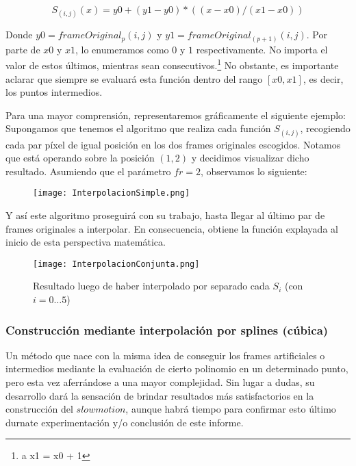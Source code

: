 \[
S_{(i,j)}(x) = y0 + (y1 - y0) * ( ( x - x0 ) / (x1 - x0) ) 
\]

Donde $y0 = frameOriginal_{p}(i,j)$ y $y1 = frameOriginal_{(p+1)}(i,j)$. Por parte de $x0$ y $x1$, lo enumeramos como $0$ y $1$ respectivamente. No importa el valor de estos \'ultimos, mientras sean consecutivos.\footnote{ a x1 = x0 + 1} No obstante, es importante aclarar que siempre se evaluar\'a esta funci\'on dentro del rango $[x0 ,x1]$, es decir, los puntos intermedios.

Para una mayor comprensi\'on, representaremos gr\'aficamente el siguiente ejemplo: Supongamos que tenemos el algoritmo que realiza cada funci\'on $S_{(i,j)}$, recogiendo cada par p\'ixel de igual posici\'on en los dos frames originales escogidos. Notamos que est\'a operando sobre la posici\'on $(1,2)$ y decidimos visualizar dicho resultado. Asumiendo que el par\'ametro $fr = 2$, observamos lo siguiente:

\begin{figure}[h!]
  \centering
    \texttt{[image: InterpolacionSimple.png]}
     \label{fig:intSimple}
\end{figure}
\noindent

Y as\'i este algoritmo proseguir\'a con su trabajo, hasta llegar al \'ultimo par de frames originales a interpolar. En consecuencia, obtiene la funci\'on explayada al inicio de esta perspectiva matem\'atica.


\begin{figure}[h!]
  \centering
    \texttt{[image: InterpolacionConjunta.png]}
     \caption{Resultado luego de haber interpolado por separado cada $S_{i}$ (con $i = 0 \ldots 5$)}\label{fig:intConjunta}
\end{figure}
\noindent

\subsubsection{Construcción mediante interpolación por splines (c\'ubica)}

Un m\'etodo que nace con la misma idea de conseguir los frames artificiales o intermedios mediante la evaluaci\'on de cierto polinomio en un determinado punto, pero esta vez aferr\'andose a una mayor complejidad. Sin lugar a dudas, su desarrollo dar\'a la sensaci\'on de brindar resultados m\'as satisfactorios en la construcci\'on del $slowmotion$, aunque habr\'a tiempo para confirmar esto \'ultimo durnate experimentaci\'on y/o conclusi\'on de este informe.

